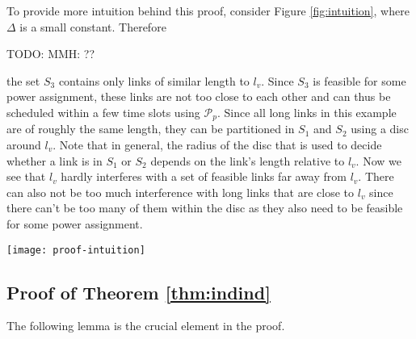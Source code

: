 \documentclass[11pt]{amsart}
\newcommand{\cal}[1]{\mathcal{#1}}
\newcommand{\todo}[1]{{\begin{small}\sffamily \color{gray}TODO:  #1 \end{small}}}
\def\calP{{\cal P}}
\def\calP{{\cal P}}   \def\calM{{\cal M}}   \def\calU{{\cal U}}   \newcommand{\PCopt}{\overline{OPT}}
\newcommand{\powp}{\calP_p}
\begin{document}
To provide more intuition behind this proof, consider Figure \ref{fig:intuition}, where $\Delta$ is a small constant. Therefore\todo{MMH: ??} the set $S_3$ contains only links of similar length to $l_v$. Since $S_3$ is feasible for some power assignment, these links are not too close to each other and can thus be scheduled within a few time slots using $\powp$. Since all long links in this example are of roughly the same length, they can be partitioned in $S_1$ and $S_2$ using a disc around $l_v$. Note that in general, the radius of the disc that is used to decide whether a link is in $S_1$ or $S_2$ depends on the link's length relative to $l_v$. Now we see that $l_v$ hardly interferes with a set of feasible links far away from $l_v$. There can also not be too much interference with long links that are close to $l_v$ since there can't be too many of them within the disc as they also need to be feasible for some power assignment.
\begin{figure*}[ht]
	\begin{center}
		\texttt{[image: proof-intuition]}
	\end{center}
	\caption{The top part of the figure displays a set $S$ of links that is (assumed to be) feasible under some power assignment. Let $l_v$ in the proof of Theorem \ref{thm:effective} be the red bold link. The center part displays long links of $S$ partitioned (in this particular example) into $S_1$ and $S_2$ using a disc around $l_v$, the lower part displays $S_3$ consisting of short links.}\label{fig:intuition}
\end{figure*}





\subsection{Proof of Theorem \ref{thm:indind}}

The following lemma is the crucial element in the proof.
\end{document}
